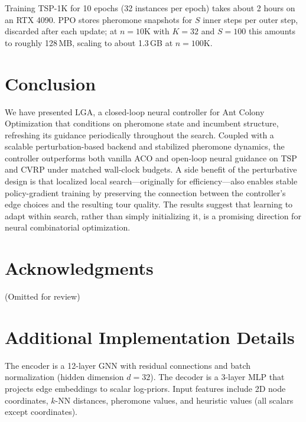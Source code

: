 \documentclass[sigconf,anonymous,review]{acmart}
\theoremstyle{definition}
\theoremstyle{plain}
\newcommand{\TSP}{\textsc{TSP}}
\newcommand{\CVRP}{\textsc{CVRP}}
\newcommand{\LGA}{\textsc{LGA}}
\begin{document}
Training TSP-1K for 10 epochs (32 instances per epoch) takes about 2 hours on an RTX 4090.
PPO stores pheromone snapshots for $S$ inner steps per outer step, discarded after each update; at $n{=}10$K with $K{=}32$ and $S{=}100$ this amounts to roughly 128\,MB, scaling to about 1.3\,GB at $n{=}100$K.

\section{Conclusion}
We have presented \LGA{}, a closed-loop neural controller for Ant Colony Optimization that conditions on pheromone state and incumbent structure, refreshing its guidance periodically throughout the search.
Coupled with a scalable perturbation-based backend and stabilized pheromone dynamics, the controller outperforms both vanilla ACO and open-loop neural guidance on \TSP{} and \CVRP{} under matched wall-clock budgets.
A side benefit of the perturbative design is that localized local search---originally for efficiency---also enables stable policy-gradient training by preserving the connection between the controller's edge choices and the resulting tour quality.
The results suggest that learning to adapt within search, rather than simply initializing it, is a promising direction for neural combinatorial optimization.

\section*{Acknowledgments}
(Omitted for review)




\appendix

\section{Additional Implementation Details}
The encoder is a 12-layer GNN with residual connections and batch normalization (hidden dimension $d=32$).
The decoder is a 3-layer MLP that projects edge embeddings to scalar log-priors.
Input features include 2D node coordinates, $k$-NN distances, pheromone values, and heuristic values (all scalars except coordinates).
\end{document}
